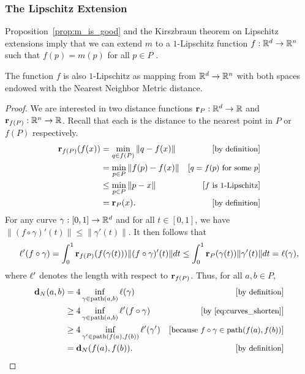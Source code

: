 \subsubsection{The Lipschitz Extension} %
\label{sec:lip_extension}

  Proposition~\ref{prop:m_is_good} and the Kirszbraun theorem on Lipschitz extensions imply that we can extend $m$ to a $1$-Lipschitz function $f: \mathbb{R}^d\to \mathbb{R}^n$ such that $f(p) = m(p)$ for all $p\in P$ \cite{Kirszbraun1934,Valentine1945,brehm1981}.

  \begin{lemma}\label{lem:dist_N_lipschitz}
    The function $f$ is also $1$-Lipschitz as mapping from $\mathbb{R}^d\to \mathbb{R}^n$ with both spaces endowed with the Nearest Neighbor Metric distance.
  \end{lemma}
  \begin{proof}
    We are interested in two distance functions $\mathbf{r}_P:\mathbb{R}^d \to \mathbb{R}$ and $\mathbf{r}_{f(P)}: \mathbb{R}^n\to \mathbb{R}$.
    Recall that each is the distance to the nearest point in $P$ or $f(P)$ respectively.
    \begin{align*}
      \mathbf{r}_{f(P)}(f(x)) 
        &= \min_{q\in f(P)} \|q - f(x)\| &\left[\text{\small{by definition}}\right]\\
        &= \min_{p\in P} \|f(p) - f(x)\| &\left[\text{\small{$q = f(p)$ for some $p$}}\right]\\
        &\le \min_{p\in P} \|p - x\| &\left[\text{\small{$f$ is $1$-Lipschitz}}\right]\\ 
        &= \mathbf{r}_P(x). &\left[\text{\small{by definition}}\right]
    \end{align*}
    For any curve $\gamma:[0,1]\to \mathbb{R}^d$ and for all $t\in [0,1]$, we have $\|(f\circ \gamma)'(t)\| \le \|\gamma'(t)\|$.
    It then follows that
    \begin{equation}\label{eq:curves_shorten}
      \ell'(f\circ \gamma) = \int_0^1 \mathbf{r}_{f(P)}(f(\gamma(t)))\|(f\circ\gamma)'(t)\|dt \le \int_0^1 \mathbf{r}_{P}(\gamma(t))\|\gamma'(t)\|dt = \ell(\gamma),
    \end{equation}
    where $\ell'$ denotes the length with respect to $\mathbf{r}_{f(P)}$.
    Thus, for all $a,b\in P$,
    \begin{align*}
      \mathbf{d}_N(a,b)
        &= 4 \inf_{\gamma\in \mathrm{path}(a,b)} \ell(\gamma) &\left[\text{\small{by definition}}\right]\\
        &\ge 4 \inf_{\gamma\in \mathrm{path}(a,b)} \ell'(f\circ\gamma) &\left[\text{\small{by \eqref{eq:curves_shorten}}}\right]\\
        &\ge 4 \inf_{\gamma'\in \mathrm{path}(f(a),f(b))} \ell'(\gamma') &\left[\text{\small{because $f\circ\gamma\in \mathrm{path}(f(a), f(b))$}}\right]\\
        &= \mathbf{d}_N(f(a), f(b)). &\left[\text{\small{by definition}}\right]
    \end{align*}
  \end{proof}
  
